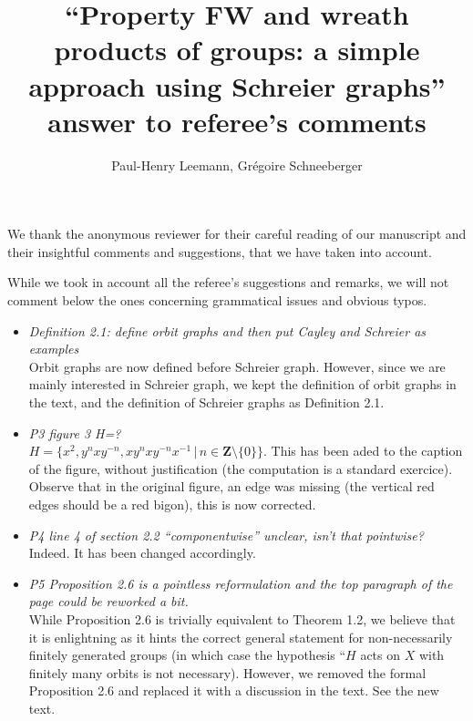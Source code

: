 \documentclass[english,a4paper]{article}
\title{``Property FW and wreath products of groups: a simple approach using Schreier graphs'' answer to referee's comments}
\author{Paul-Henry Leemann, Grégoire Schneeberger}
\newcommand*\setst[2]{\{#1\,|\,#2\}}
\begin{document}
\maketitle
%
%
%
%
%
%
%
%
%
%
We thank the anonymous reviewer for their careful reading of our manuscript and their insightful comments and suggestions, that we have taken into account.

While we took in account all the referee’s suggestions and remarks, we will not comment below the ones concerning grammatical issues and obvious typos.
\begin{itemize}
%
\item\textit{Definition 2.1: define orbit graphs and then put Cayley and Schreier as examples}\\
Orbit graphs are now defined before Schreier graph. However, since we are mainly interested in Schreier graph, we kept the definition of orbit graphs in the text, and the definition of Schreier graphs as Definition 2.1.
%
\item\textit{P3 figure 3 H=?}\\
$H=\setst{x^2,y^nxy^{-n},xy^nxy^{-n}x^{-1}}{n\in\mathbf{Z}\setminus\{0\}}$. This has been aded to the caption of the figure, without justification (the computation is a standard exercice). Observe that in the original figure, an edge was missing (the vertical red edges should be a red bigon), this is now corrected.
%
\item\textit{P4 line 4 of section 2.2 “componentwise” unclear, isn’t that pointwise?}\\
Indeed. It has been changed accordingly.
%
\item\textit{P5 Proposition 2.6 is a pointless reformulation and the top paragraph of the page could be reworked a bit.}\\
While Proposition 2.6 is trivially equivalent to Theorem 1.2, we believe that  it is enlightning as it hints the correct general statement for non-necessarily finitely generated groups (in which case the hypothesis ``$H$ acts on $X$ with finitely many orbits is not necessary).
However, we removed the formal Proposition 2.6 and replaced it with a discussion in the text.
See the new text.



\end{itemize}
\end{document}
